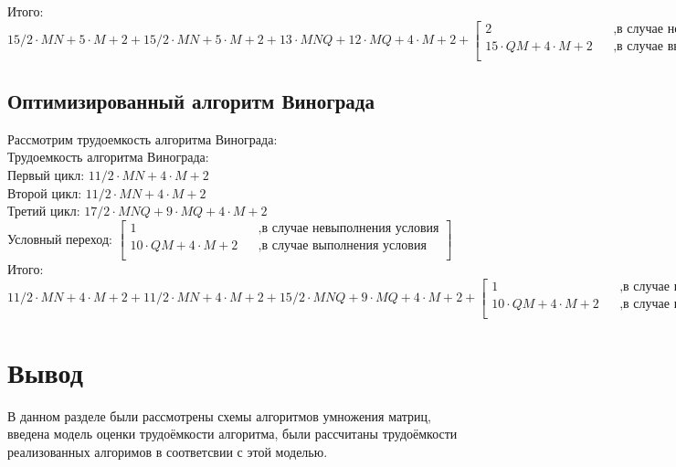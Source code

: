 \documentclass[12pt]{report}
\begin{document}
Итого: $15/2 \cdot M  N + 5 \cdot M + 2 + 15/2 \cdot M  N + 5 \cdot M + 2 + 13 \cdot M  N Q + 12 \cdot M Q + 4 \cdot M + 2 +
       \begin{bmatrix}
             2    &&, \text{в случае невыполнения условия}\\
             15 \cdot QM + 4 \cdot M + 2 &&, \text{в случае выполнения условия}\\
           \end{bmatrix} $ \\

\subsection{Оптимизированный алгоритм Винограда}

Рассмотрим трудоемкость алгоритма Винограда:\\

Трудоемкость алгоритма Винограда:\\

Первый цикл: $11/2 \cdot M  N + 4 \cdot M + 2$ \\

Второй цикл: $11/2 \cdot M  N + 4 \cdot M + 2$\\

Третий цикл: $17/2 \cdot M  N Q + 9 \cdot M Q + 4 \cdot M + 2$\\

Условный переход: $\begin{bmatrix}
             1    &&, \text{в случае невыполнения условия}\\
             10 \cdot QM + 4 \cdot M + 2 &&, \text{в случае выполнения условия}\\
           \end{bmatrix} $ \\

Итого: $11/2 \cdot M  N + 4 \cdot M + 2 + 11/2 \cdot M  N + 4 \cdot M + 2 + 15/2 \cdot M  N Q + 9 \cdot M Q + 4 \cdot M + 2 +
       \begin{bmatrix}
             1    &&, \text{в случае невыполнения условия}\\
             10 \cdot QM + 4 \cdot M + 2 &&, \text{в случае выполнения условия}\\
           \end{bmatrix} $ \\

\section{Вывод}
В данном разделе были рассмотрены схемы алгоритмов умножения матриц, введена модель оценки
трудоёмкости алгоритма, были рассчитаны трудоёмкости реализованных алгоримов в соответсвии 
с этой моделью.
\end{document}
